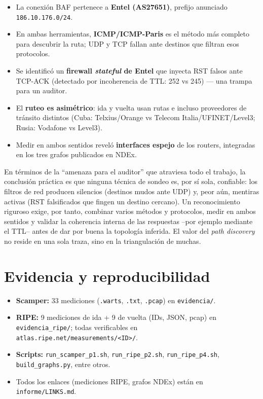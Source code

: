 \documentclass[11pt,a4paper]{article}
\newcommand{\ip}[1]{\texttt{#1}}
\begin{document}
\begin{itemize}[nosep]
  \item La conexión BAF pertenece a \textbf{Entel (AS27651)}, prefijo anunciado \ip{186.10.176.0/24}.
  \item En ambas herramientas, \textbf{ICMP/ICMP-Paris} es el método más completo para descubrir
  la ruta; UDP y TCP fallan ante destinos que filtran esos protocolos.
  \item Se identificó un \textbf{firewall \emph{stateful} de Entel} que inyecta RST falsos ante
  TCP-ACK (detectado por incoherencia de TTL: 252 vs 245) --- una trampa para un auditor.
  \item El \textbf{ruteo es asimétrico}: ida y vuelta usan rutas e incluso proveedores de tránsito
  distintos (Cuba: Telxius/Orange vs Telecom Italia/UFINET/Level3; Rusia: Vodafone vs Level3).
  \item Medir en ambos sentidos reveló \textbf{interfaces espejo} de los routers, integradas en
  los tres grafos publicados en NDEx.
\end{itemize}

\noindent En términos de la ``amenaza para el auditor'' que atraviesa todo el trabajo, la
conclusión práctica es que ninguna técnica de sondeo es, por sí sola, confiable: los filtros de
red producen silencios (destinos mudos ante UDP) y, peor aún, mentiras activas (RST falsificados
que fingen un destino cercano). Un reconocimiento riguroso exige, por tanto, combinar varios
métodos y protocolos, medir en ambos sentidos y validar la coherencia interna de las respuestas
--por ejemplo mediante el TTL-- antes de dar por buena la topología inferida. El valor del
\emph{path discovery} no reside en una sola traza, sino en la triangulación de muchas.

\appendix
\section{Evidencia y reproducibilidad}
\begin{itemize}[nosep]
  \item \textbf{Scamper:} 33 mediciones (\texttt{.warts}, \texttt{.txt}, \texttt{.pcap}) en
  \texttt{evidencia/}.
  \item \textbf{RIPE:} 9 mediciones de ida + 9 de vuelta (IDs, JSON, pcap) en
  \texttt{evidencia\_ripe/}; todas verificables en \texttt{atlas.ripe.net/measurements/<ID>/}.
  \item \textbf{Scripts:} \texttt{run\_scamper\_p1.sh}, \texttt{run\_ripe\_p2.sh},
  \texttt{run\_ripe\_p4.sh}, \texttt{build\_graphs.py}, entre otros.
  \item Todos los enlaces (mediciones RIPE, grafos NDEx) están en \texttt{informe/LINKS.md}.
\end{itemize}
\end{document}
